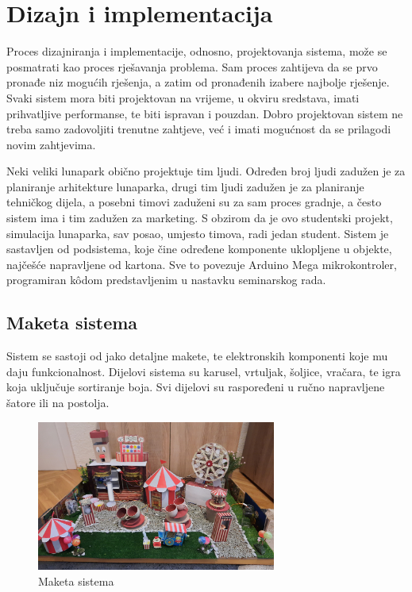 \chapter{Dizajn i implementacija}

Proces dizajniranja i implementacije, odnosno, projektovanja sistema, može se posmatrati kao proces rješavanja problema. Sam proces zahtijeva da se prvo pronađe niz mogućih rješenja, a zatim od pronađenih izabere najbolje rješenje. Svaki sistem mora biti projektovan na vrijeme, u okviru sredstava, imati prihvatljive performanse, te biti ispravan i pouzdan. Dobro projektovan sistem ne treba samo zadovoljiti trenutne zahtjeve, već i imati mogućnost da se prilagodi novim zahtjevima. 

Neki veliki lunapark obično projektuje tim ljudi. Određen broj ljudi zadužen je za planiranje arhitekture lunaparka, drugi tim ljudi zadužen je za planiranje tehničkog dijela, a posebni timovi zaduženi su za sam proces gradnje, a često sistem ima i tim zadužen za marketing. S obzirom da je ovo studentski projekt, simulacija lunaparka, sav posao, umjesto timova, radi jedan student. Sistem je sastavljen od podsistema, koje čine određene komponente uklopljene u objekte, najčešće napravljene od kartona. Sve to povezuje Arduino Mega mikrokontroler, programiran kôdom predstavljenim u nastavku seminarskog rada. 

 
\section{Maketa sistema}
Sistem se sastoji od jako detaljne makete, te elektronskih komponenti koje mu daju funkcionalnost. Dijelovi sistema su karusel, vrtuljak, šoljice, vračara, te igra koja uključuje sortiranje boja. Svi dijelovi su raspoređeni u ručno napravljene šatore ili na postolja. 
 \begin{figure}[h!]
  \centering
  \includegraphics[width=0.7\textwidth]{maketa3}
  \caption{Maketa sistema}
  \label{fig:Slika_Maketa}
\end{figure}

